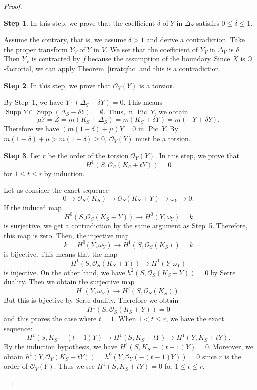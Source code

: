 \documentclass[12pt,twoside]{amsart}
\newcommand{\Supp}[0]{{\operatorname{Supp}}}
\newcommand{\Pic}[0]{{\operatorname{Pic}}}
\theoremstyle{definition}
\newtheorem{step}{Step}
\newcommand{\Q}{$\mathbb{Q}$}
\begin{document}
\begin{proof}
\begin{step}
In this step, we prove that the coefficient $\delta$ of $Y$ in $\Delta_S$ 
satisfies $0\leq \delta \leq 1$. 

Assume the contrary, that is, we assume $\delta>1$ and 
derive a contradiction. 
Take the proper transform $Y_V$ of $Y$ in $V$. 
We see that the coefficient of $Y_V$ in $\Delta_V$ is $\delta$. 
Then $Y_V$ is contracted by $f$ because the assumption of the boundary. 
Since $X$ is \Q-factorial, we can apply Theorem~\ref{irratqfac} and 
this is a contradiction. 
\end{step}

\begin{step}
In this step, we prove that $\mathcal{O}_Y(Y)$ is a torsion. 

By Step~1, we have $Y\cdot (\Delta_S-\delta Y)=0$. 
This means $\Supp Y\cap \Supp(\Delta_S-\delta Y)=\emptyset$. 
Thus, in $\Pic~Y$, we obtain 
$$\mu Y=Z=m(K_S+\Delta_S)=m(K_S+\delta Y)=m(-Y+\delta Y). $$
Therefore we have $(m(1-\delta)+\mu)Y=0$ in $\Pic~Y$. 
By $m(1-\delta)+\mu>m(1-\delta)\geq 0$, 
$\mathcal{O}_Y(Y)$ must be a torsion. 
\end{step}

\begin{step}
Let $r$ be the order of the torsion $\mathcal{O}_Y(Y)$. 
In this step, we prove that 
$$H^1(S, \mathcal O_S(K_S+tY))=0$$
for $1\leq t \leq r$ by induction. 

Let us consider the exact sequence
$$0 \to \mathcal{O}_S(K_S) \to \mathcal{O}_S(K_S+Y) 
\to \omega_Y\to 0.$$
If the induced map 
$$H^0(S, \mathcal{O}_S(K_S+Y)) \to H^0(Y, \omega_Y)=k$$ 
is surjective, we get a contradiction by the same argument as Step~5. 
Therefore, this map is zero. 
Then, the injective map 
$$k=H^0(Y, \omega_Y) \to H^1(S, \mathcal{O}_S(K_S))=k$$
is bijective. 
This means that the map
$$H^1(S, \mathcal{O}_S(K_S+Y))\to H^1(Y, \omega_Y)$$
is injective. 
On the other hand, we have 
$h^2(S, \mathcal{O}_S(K_S+Y))=0$ by Serre duality. 
Then we obtain the surjective map 
$$H^1(Y, \omega_Y) \to H^2(S, \mathcal{O}_S(K_S)).$$
But this is bijective by Serre duality. 
Therefore we obtain 
$$H^1(S, \mathcal{O}_S(K_S+Y))=0$$
and this proves the case where $t=1$. 
When $1<t\leq r$, we have the exact sequence: 
$$H^1(S, K_S+(t-1)Y)\to 
H^1(S, K_S+tY)\to 
H^1(Y, K_S+tY).$$
By the induction hypothesis, we have $H^1(S, K_S+(t-1)Y)=0$. 
Moreover, we obtain 
$h^1(Y, \mathcal{O}_Y(K_S+tY))=h^0(Y, \mathcal{O}_Y(-(t-1)Y))=0$ 
since $r$ is the order of $\mathcal{O}_Y(Y)$. 
Thus we see $H^1(S, K_S+tY)=0$ for $1\leq t \leq r$. 
\end{step}


\end{proof}
\end{document}
